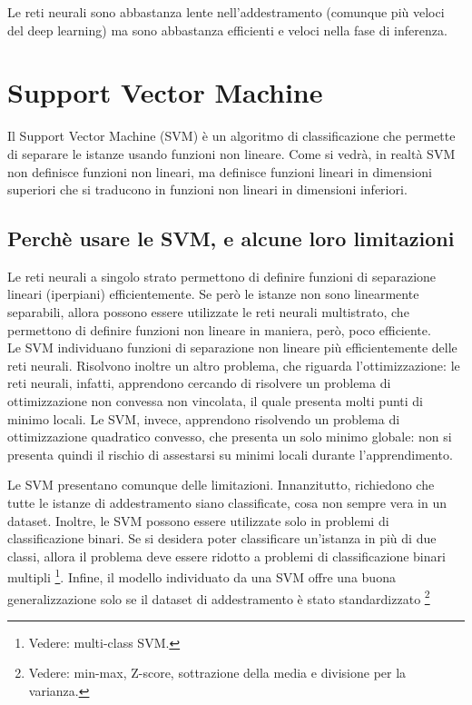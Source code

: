 Le reti neurali sono abbastanza lente nell'addestramento (comunque più veloci del deep learning) ma sono abbastanza efficienti e veloci nella fase di inferenza. 

\section{Support Vector Machine}
Il Support Vector Machine (SVM) è un algoritmo di classificazione che permette di separare le istanze usando funzioni non lineare. Come si vedrà, in realtà SVM non definisce funzioni non lineari, ma definisce funzioni lineari in dimensioni superiori che si traducono in funzioni non lineari in dimensioni inferiori. 

\subsection{Perchè usare le SVM, e alcune loro limitazioni}
Le reti neurali a singolo strato permettono di definire funzioni di separazione lineari (iperpiani) efficientemente. Se però le istanze non sono linearmente separabili, allora possono essere utilizzate le reti neurali multistrato, che permettono di definire funzioni non lineare in maniera, però, poco efficiente.\\
Le SVM individuano funzioni di separazione non lineare più efficientemente delle reti neurali. Risolvono inoltre un altro problema, che riguarda l'ottimizzazione: le reti neurali, infatti, apprendono cercando di risolvere un problema di ottimizzazione non convessa non vincolata, il quale presenta molti punti di minimo locali. Le SVM, invece, apprendono risolvendo un problema di ottimizzazione quadratico convesso, che presenta un solo minimo globale: non si presenta quindi il rischio di assestarsi su minimi locali durante l'apprendimento.

Le SVM presentano comunque delle limitazioni. Innanzitutto, richiedono che tutte le istanze di addestramento siano classificate, cosa non sempre vera in un dataset.
Inoltre, le SVM possono essere utilizzate solo in problemi di classificazione binari. Se si desidera poter classificare un'istanza in più di due classi, allora il problema deve essere ridotto a problemi di classificazione binari multipli \footnote{Vedere: multi-class SVM.}.
Infine, il modello individuato da una SVM offre una buona generalizzazione solo se il dataset di addestramento è stato standardizzato \footnote{Vedere: min-max, Z-score, sottrazione della media e divisione per la varianza.}

